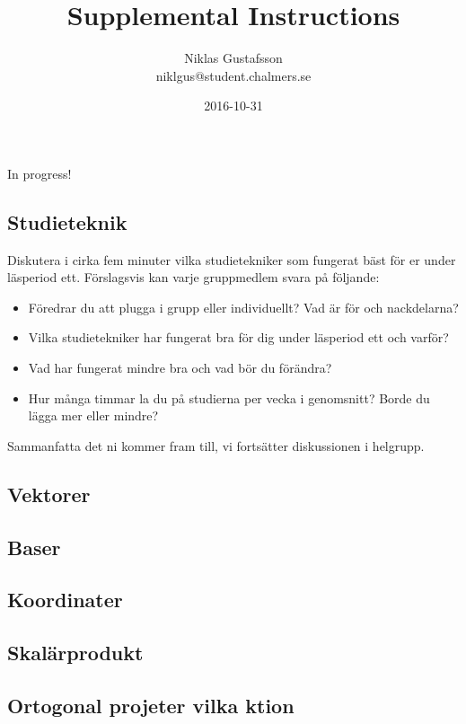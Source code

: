 \documentclass{article}
\title{Supplemental Instructions}
\author{Niklas Gustafsson \\ 
		\small{niklgus@student.chalmers.se}
}
\date{
      2016-10-31
     }
\begin{document}
\maketitle
In progress!
\subsection*{Studieteknik}
Diskutera i cirka fem minuter vilka studietekniker som fungerat bäst för er under läsperiod ett. Förslagsvis kan varje gruppmedlem svara på följande:
\begin{itemize}
\item Föredrar du att plugga i grupp eller individuellt? Vad är för och nackdelarna?
\item Vilka studietekniker har fungerat bra för dig under läsperiod ett och varför?
\item Vad har fungerat mindre bra och vad bör du förändra?
\item Hur många timmar la du på studierna per vecka i genomsnitt? Borde du lägga mer eller mindre?
\end{itemize}

\noindent
Sammanfatta det ni kommer fram till, vi fortsätter diskussionen i helgrupp. 

\subsection*{Vektorer}
\subsection*{Baser}
\subsection*{Koordinater}

\subsection*{Skalärprodukt}
\subsection*{Ortogonal projeter vilka ktion}
\end{document}
